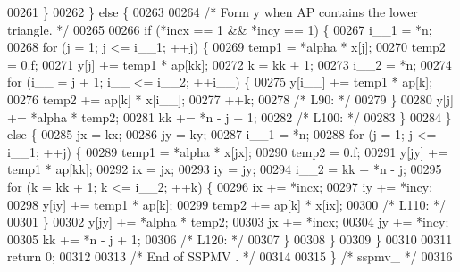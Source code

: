 \begin{DoxyCode}
00261     \}
00262     \} \textcolor{keywordflow}{else} \{
00263 
00264 \textcolor{comment}{/*        Form  y  when AP contains the lower triangle. */}
00265 
00266     \textcolor{keywordflow}{if} (*incx == 1 && *incy == 1) \{
00267         i\_\_1 = *n;
00268         \textcolor{keywordflow}{for} (j = 1; j <= i\_\_1; ++j) \{
00269         temp1 = *alpha * x[j];
00270         temp2 = 0.f;
00271         y[j] += temp1 * ap[kk];
00272         k = kk + 1;
00273         i\_\_2 = *n;
00274         \textcolor{keywordflow}{for} (i\_\_ = j + 1; i\_\_ <= i\_\_2; ++i\_\_) \{
00275             y[i\_\_] += temp1 * ap[k];
00276             temp2 += ap[k] * x[i\_\_];
00277             ++k;
00278 \textcolor{comment}{/* L90: */}
00279         \}
00280         y[j] += *alpha * temp2;
00281         kk += *n - j + 1;
00282 \textcolor{comment}{/* L100: */}
00283         \}
00284     \} \textcolor{keywordflow}{else} \{
00285         jx = kx;
00286         jy = ky;
00287         i\_\_1 = *n;
00288         \textcolor{keywordflow}{for} (j = 1; j <= i\_\_1; ++j) \{
00289         temp1 = *alpha * x[jx];
00290         temp2 = 0.f;
00291         y[jy] += temp1 * ap[kk];
00292         ix = jx;
00293         iy = jy;
00294         i\_\_2 = kk + *n - j;
00295         \textcolor{keywordflow}{for} (k = kk + 1; k <= i\_\_2; ++k) \{
00296             ix += *incx;
00297             iy += *incy;
00298             y[iy] += temp1 * ap[k];
00299             temp2 += ap[k] * x[ix];
00300 \textcolor{comment}{/* L110: */}
00301         \}
00302         y[jy] += *alpha * temp2;
00303         jx += *incx;
00304         jy += *incy;
00305         kk += *n - j + 1;
00306 \textcolor{comment}{/* L120: */}
00307         \}
00308     \}
00309     \}
00310 
00311     \textcolor{keywordflow}{return} 0;
00312 
00313 \textcolor{comment}{/*     End of SSPMV . */}
00314 
00315 \} \textcolor{comment}{/* sspmv\_ */}
00316 
\end{DoxyCode}
